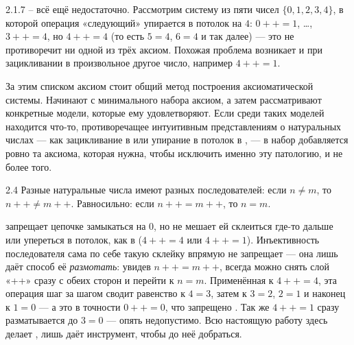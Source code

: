 \begin{example}{2.1.7}{}
– всё ещё недостаточно. Рассмотрим систему из пяти чисел $\{0,1,2,3,4\}$,
в которой операция «следующий» упирается в потолок на $4$: $0{+}{+}=1$, \dots, $3{+}{+}=4$,
но $4{+}{+}=4$ (то есть $5=4$, $6=4$ и так далее) — это не противоречит ни одной из трёх
аксиом. Похожая проблема возникает и при зацикливании в произвольное другое число,
например $4{+}{+}=1$.
\end{example}

\begin{remark}
За этим списком аксиом стоит общий метод построения аксиоматической системы. Начинают с
минимального набора аксиом, а затем рассматривают конкретные модели, которые ему
удовлетворяют. Если среди таких моделей находится что-то, противоречащее интуитивным
представлениям о натуральных числах — как зацикливание в 
или упирание в потолок в , — в набор добавляется ровно та
аксиома, которая нужна, чтобы исключить именно эту патологию, и не более того.
\end{remark}

\begin{axiom}{2.4}{}
Разные натуральные числа имеют разных последователей: если $n \neq m$, то
$n{+}{+} \neq m{+}{+}$. Равносильно: если $n{+}{+} = m{+}{+}$, то $n = m$.
\end{axiom}

\begin{intuition}
 запрещает цепочке замыкаться на $0$, но не мешает ей склеиться где-то дальше или
упереться в потолок, как в  ($4{+}{+}=4$ или $4{+}{+}=1$).
Инъективность последователя сама по себе такую склейку впрямую не запрещает — она лишь даёт
способ её \emph{размотать}: увидев $n{+}{+}=m{+}{+}$, всегда можно снять слой «++» сразу с
обеих сторон и перейти к $n=m$. Применённая к $4{+}{+}=4$, эта операция шаг за шагом сводит
равенство к $4=3$, затем к $3=2$, $2=1$ и наконец к $1=0$ — а это в точности $0{+}{+}=0$,
что запрещено . Так же $4{+}{+}=1$ сразу разматывается до $3=0$ —
опять недопустимо. Всю настоящую работу здесь делает , 
лишь даёт инструмент, чтобы до неё добраться.
\end{intuition}


